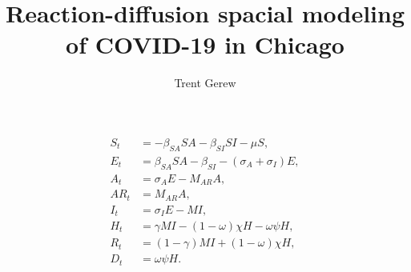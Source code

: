 \documentclass[10pt,letterpaper,draft]{article}
\author{Trent Gerew}
\title{Reaction-diffusion spacial modeling of COVID-19 in Chicago}
\begin{document}
	\begin{align}
		S_t &= - \beta_{SA} SA - \beta_{SI} SI - \mu S, \\
		E_t &= \beta_{SA} SA - \beta_{SI} - (\sigma_A + \sigma_I) E, \\
		A_t &= \sigma_A E - M_{AR} A, \\
		AR_t &= M_{AR} A, \\
		I_t &= \sigma_I E - MI, \\
		H_t &= \gamma M I - (1 - \omega) \chi H - \omega \psi H, \\
		R_t &= (1 - \gamma) M I + (1 - \omega) \chi H, \\
		D_t &= \omega \psi H.
	\end{align}
\end{document}
